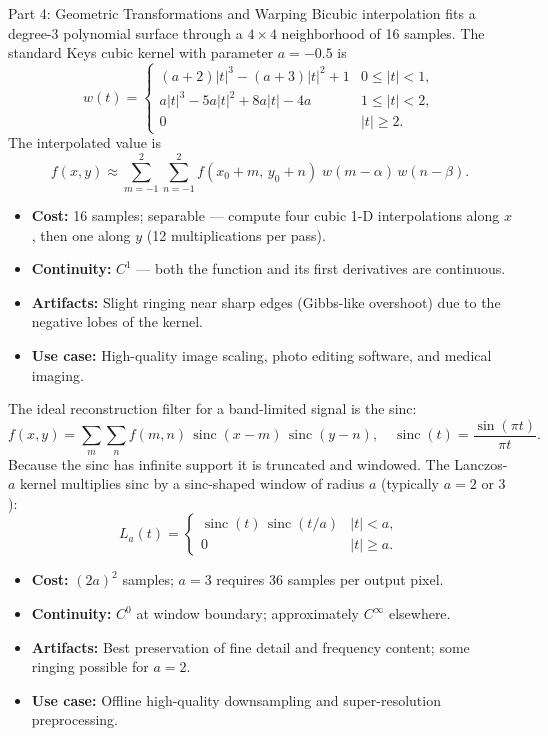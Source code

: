 \documentclass[letterpaper]{article}
\begin{document}
\begin{notes}{Part 4: Geometric Transformations and Warping}
Bicubic interpolation fits a degree-3 polynomial surface through a $4\times4$ neighborhood of 16 samples. The standard Keys cubic kernel with parameter $a=-0.5$ is
$$w(t) = \begin{cases}
(a+2)|t|^3 - (a+3)|t|^2 + 1 & 0 \le |t| < 1, \\
a|t|^3 - 5a|t|^2 + 8a|t| - 4a & 1 \le |t| < 2, \\
0 & |t| \ge 2.
\end{cases}$$
The interpolated value is
$$f(x,y) \approx \sum_{m=-1}^{2}\sum_{n=-1}^{2} f(x_0{+}m,\, y_0{+}n)\; w(m-\alpha)\, w(n-\beta).$$
\begin{itemize}
    \item \textbf{Cost:} 16 samples; separable — compute four cubic 1-D interpolations along $x$, then one along $y$ (12 multiplications per pass).
    \item \textbf{Continuity:} $C^1$ — both the function and its first derivatives are continuous.
    \item \textbf{Artifacts:} Slight ringing near sharp edges (Gibbs-like overshoot) due to the negative lobes of the kernel.
    \item \textbf{Use case:} High-quality image scaling, photo editing software, and medical imaging.
\end{itemize}


The ideal reconstruction filter for a band-limited signal is the sinc:
$$f(x,y) = \sum_{m}\sum_{n} f(m,n)\,\operatorname{sinc}(x-m)\,\operatorname{sinc}(y-n), \quad \operatorname{sinc}(t) = \frac{\sin(\pi t)}{\pi t}.$$
Because the sinc has infinite support it is truncated and windowed. The Lanczos-$a$ kernel multiplies sinc by a sinc-shaped window of radius $a$ (typically $a=2$ or $3$):
$$L_a(t) = \begin{cases} \operatorname{sinc}(t)\,\operatorname{sinc}(t/a) & |t| < a, \\ 0 & |t| \ge a. \end{cases}$$
\begin{itemize}
    \item \textbf{Cost:} $(2a)^2$ samples; $a=3$ requires 36 samples per output pixel.
    \item \textbf{Continuity:} $C^0$ at window boundary; approximately $C^\infty$ elsewhere.
    \item \textbf{Artifacts:} Best preservation of fine detail and frequency content; some ringing possible for $a=2$.
    \item \textbf{Use case:} Offline high-quality downsampling and super-resolution preprocessing.
\end{itemize}


\end{notes}
\end{document}
